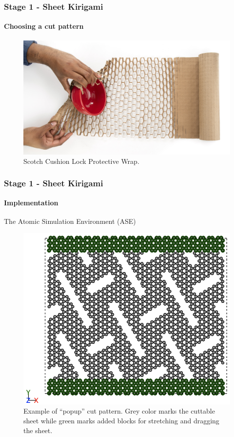 \documentclass[
	10pt, %
]{beamer}
\begin{document}
\begin{frame}
	\frametitle{Stage 1 - Sheet Kirigami}
	\framesubtitle{Choosing a cut pattern}

	\begin{figure}
		\includegraphics[height=0.6\textheight]{figures/Scotch_Cushion_Lock_1.jpg}
		\caption{Scotch Cushion Lock Protective Wrap.}
	\end{figure}	
	
\end{frame}



\begin{frame}
	\frametitle{Stage 1 - Sheet Kirigami}
	\framesubtitle{Implementation}

	The Atomic Simulation Environment (ASE)

	\begin{figure}
		\includegraphics[height=0.6\textheight]{figures/cutpattern.png}
		\caption{Example of ``popup'' cut pattern. Grey color marks the cuttable sheet while green marks added blocks for stretching and dragging the sheet.}
	\end{figure}	

\end{frame}
\end{document}
